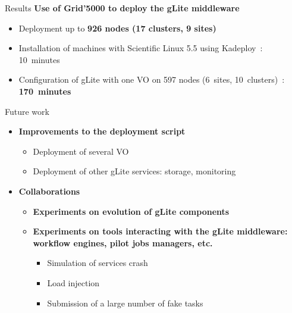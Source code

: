 \documentclass[11pt,final,usepdftitle=false,handout]{beamer}
\begin{document}
\begin{frame}{Results}
	\textbf{Use of Grid'5000 to deploy the gLite middleware}
		\bigskip
\begin{itemize}
	\item Deployment up to \textbf{926 nodes (17 clusters, 9 sites)}
		\bigskip
\item Installation of machines with Scientific Linux 5.5 using Kadeploy~: 10~minutes
		\bigskip
\item Configuration of gLite with one VO on 597 nodes (6~sites, 10~clusters)~: \textbf{170~minutes}
\end{itemize}
	\end{frame}

	\begin{frame}{Future work}
	\begin{itemize}
		\item \textbf{Improvements to the deployment script}
		\begin{itemize}
		\item Deployment of several VO
		\item Deployment of other gLite services: storage, monitoring
		\bigskip
			\end{itemize}
		\item \textbf{Collaborations}
		\smallskip
			\begin{itemize}
				\item \textbf{Experiments on evolution of gLite components}
		\medskip
				\item \textbf{Experiments on tools interacting with the gLite middleware: workflow engines, pilot jobs managers, etc.}
					\begin{itemize}
						\item Simulation of services crash
						\item Load injection 
						\item Submission of a large number of fake tasks
					\end{itemize}
			\end{itemize}
	\end{itemize}
	\end{frame}
\end{document}

